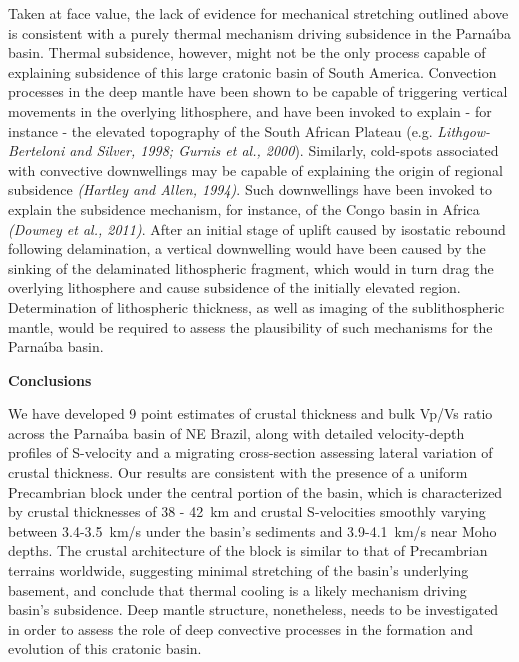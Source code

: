 \documentclass[manuscript,11pt]{geophysics}
\begin{document}
Taken at face value, the lack of evidence for mechanical stretching outlined above is consistent with a purely thermal mechanism driving subsidence in the Parna\'{\i}ba basin. Thermal subsidence, however, might not be the only process capable of explaining subsidence of this large cratonic basin of South America. Convection processes in the deep mantle have been shown to be capable of triggering vertical movements in the overlying lithosphere, and have been invoked to explain - for instance - the elevated topography of the South African Plateau (e.g. \textit{Lithgow-Berteloni and Silver, 1998; Gurnis et al., 2000}). Similarly, cold-spots associated with convective downwellings may be capable of explaining the origin of regional subsidence \textit{(Hartley and Allen, 1994)}. Such downwellings have been invoked to explain the subsidence mechanism, for instance, of the Congo basin in Africa \textit{(Downey et al., 2011)}. After an initial stage of uplift caused by isostatic rebound following delamination, a vertical downwelling would have been caused by the sinking of the delaminated lithospheric fragment, which would in turn drag the overlying lithosphere and cause subsidence of the initially elevated region. Determination of lithospheric thickness, as well as imaging of the sublithospheric mantle, would be required to assess the plausibility of such mechanisms for the Parna\'{\i}ba basin.

\begin{flushleft}
\textbf{\LARGE Conclusions}
\end{flushleft}

We have developed 9 point estimates of crustal thickness and bulk Vp/Vs ratio across the Parna\'{\i}ba basin of NE Brazil, along with detailed velocity-depth profiles of S-velocity and a migrating cross-section assessing lateral variation of crustal thickness. Our results are consistent with the presence of a uniform Precambrian block under the central portion of the basin, which is characterized by crustal thicknesses of 38 - 42~km and crustal S-velocities smoothly varying between 3.4-3.5~km/s under the basin's sediments and 3.9-4.1~km/s near Moho depths. The crustal architecture of the block is similar to that of Precambrian terrains worldwide, suggesting minimal stretching of the basin's underlying basement, and conclude that thermal cooling is a likely mechanism driving basin's subsidence. Deep mantle structure, nonetheless, needs to be investigated in order to assess the role of deep convective processes in the formation and evolution of this cratonic basin.
\end{document}
